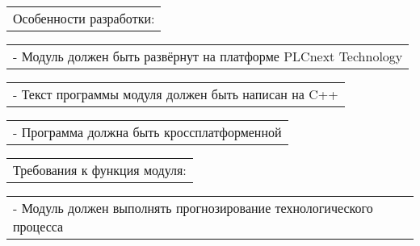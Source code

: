 \documentclass[12pt, А4, twoside]{article}
\begin{document}
\begin{FlushLeft}
    \vspace{-0.1 cm}

    \begin{tabular}{p{17.25cm}}  
        \hspace{0.3cm} \textsf{Особенности разработки:} \vspace{0pt} \hline \\
    \end{tabular}

    \vspace{-0.1 cm}

    \begin{tabular}{p{17.25cm}}  
        \hspace{0.6cm} \textsf{- Модуль должен быть развёрнут на платформе PLCnext Technology} \vspace{0pt} \hline \\
    \end{tabular}

    \vspace{-0.1 cm}

    \begin{tabular}{p{17.25cm}}  
        \hspace{0.6cm} \textsf{- Текст программы модуля должен быть написан на C++}\vspace{0pt} \hline \\
    \end{tabular}

    \vspace{-0.1 cm}

    \begin{tabular}{p{17.25cm}}  
        \hspace{0.6cm} \textsf{- Программа должна быть кроссплатформенной}\vspace{0pt} \hline 
    \end{tabular}   

    \vspace{-0.1 cm}

    \begin{tabular}{p{17.25cm}} 
        \hspace{0.3cm} \textsf{Требования к функция модуля:} \vspace{0pt} \hline \\
    \end{tabular}  

    \vspace{-0.1 cm}

    \begin{tabular}{p{17.25cm}} 
        \hspace{0.6cm} \textsf{- Модуль должен выполнять прогнозирование технологического процесса}\vspace{0pt} \hline \\
    \end{tabular}  


\end{FlushLeft}
\end{document}

